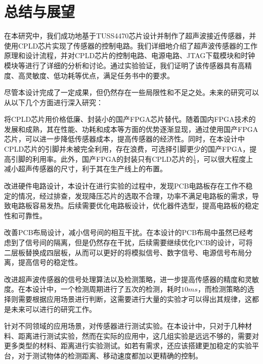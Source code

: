 \newpage
\section{总结与展望}
在本研究中，我们成功地基于TUSS4470芯片设计并制作了超声波接近传感器，并使用CPLD芯片实现了传感器的控制电路。我们详细地介绍了超声波传感器的工作原理和设计流程，并对CPLD芯片的控制电路、电源电路、JTAG下载模块和时钟模块等进行了详细的分析和讨论。通过实验验证，我们证明了该传感器具有高精度、高灵敏度、低功耗等优点，满足任务书中的要求。\par
尽管本设计完成了一定成果，但仍然存在一些局限性和不足之处。未来的研究可以从以下几个方面进行深入研究：\par
将CPLD芯片用价格低廉、封装小的国产FPGA芯片替代。随着国内FPGA技术的发展和成熟，其在性能、功耗和成本等方面的优势逐渐显现，通过使用国产FPGA芯片，可以进一步降低传感器成本，提高传感器的经济性。同时，在本设计中CPLD芯片的引脚并未被完全利用，存在浪费，可选择引脚更少的国产FPGA，提高引脚的利用率。此外，国产FPGA的封装只有CPLD芯片的$\frac{1}{4}$，可以很大程度上减小超声传感器的尺寸，利于其在生产线上的布置。\par
改进硬件电路设计，本设计在进行实验的过程中，发现PCB电路板存在工作不稳定的情况，经过排查，发现降压芯片的选取不合理，功率不满足电路板的需求，导致电路板容易发热。后续需要优化电路板设计，优化器件选型，提高电路板的稳定性和可靠性。\par
改善PCB布局设计，减小信号间的相互干扰。在本设计的PCB布局中虽然已经考虑到了信号间的隔离，但是仍然存在干扰，后续需要继续优化PCB的设计，可将二层板替换成四层板，从而可以更好的将模拟信号、数字信号、电源信号布局分离，提高信号的稳定性。\par
改进超声波传感器的信号处理算法以及检测策略，进一步提高传感器的精度和灵敏度。在本设计中，一个检测周期进行了五次的检测，耗时$10ms$，而检测策略的选择则需要根据应用场景进行判断，这需要进行大量的实验才可以得出其规律，这都是未来可以进行的研究工作。\par
针对不同领域的应用场景，对传感器进行测试实验。在本设计中，只对于几种材料、距离进行测试实验，然而在实际的应用中，这几组实验是远远不够的，需要对更多类型的材料、距离进行实验测试。如若有需求，还应该搭建更加稳定的实验平台，对于测试物体的检测距离、移动速度都加以更精确的控制。\par


